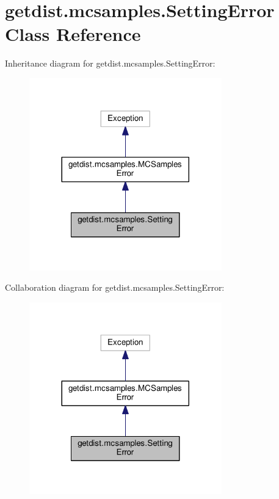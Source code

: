 \hypertarget{classgetdist_1_1mcsamples_1_1SettingError}{}\section{getdist.\+mcsamples.\+Setting\+Error Class Reference}
\label{classgetdist_1_1mcsamples_1_1SettingError}


Inheritance diagram for getdist.\+mcsamples.\+Setting\+Error\+:
\nopagebreak
\begin{figure}[H]
\begin{center}
\leavevmode
\includegraphics[width=236pt]{classgetdist_1_1mcsamples_1_1SettingError__inherit__graph}
\end{center}
\end{figure}


Collaboration diagram for getdist.\+mcsamples.\+Setting\+Error\+:
\nopagebreak
\begin{figure}[H]
\begin{center}
\leavevmode
\includegraphics[width=236pt]{classgetdist_1_1mcsamples_1_1SettingError__coll__graph}
\end{center}
\end{figure}


